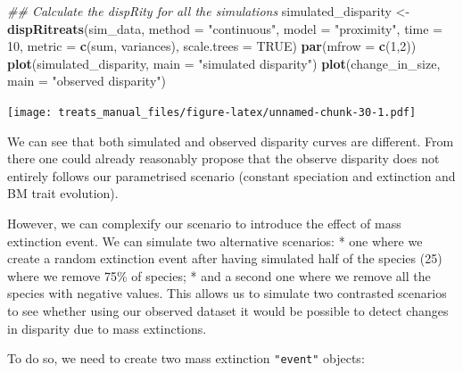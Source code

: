 \documentclass[
]{book}
\newenvironment{Shaded}{\begin{snugshade}}{\end{snugshade}}
\newcommand{\CommentTok}[1]{\textcolor[rgb]{0.56,0.35,0.01}{\textit{#1}}}
\newcommand{\DataTypeTok}[1]{\textcolor[rgb]{0.13,0.29,0.53}{#1}}
\newcommand{\DecValTok}[1]{\textcolor[rgb]{0.00,0.00,0.81}{#1}}
\newcommand{\KeywordTok}[1]{\textcolor[rgb]{0.13,0.29,0.53}{\textbf{#1}}}
\newcommand{\NormalTok}[1]{#1}
\newcommand{\OtherTok}[1]{\textcolor[rgb]{0.56,0.35,0.01}{#1}}
\newcommand{\StringTok}[1]{\textcolor[rgb]{0.31,0.60,0.02}{#1}}
\begin{document}
\begin{Shaded}
\begin{Highlighting}[]
\CommentTok{\#\# Calculate the dispRity for all the simulations}
\NormalTok{simulated\_disparity \textless{}{-}}\StringTok{ }\KeywordTok{dispRitreats}\NormalTok{(sim\_data,}
                                    \DataTypeTok{method =} \StringTok{"continuous"}\NormalTok{,}
                                    \DataTypeTok{model  =} \StringTok{"proximity"}\NormalTok{,}
                                    \DataTypeTok{time   =} \DecValTok{10}\NormalTok{,}
                                    \DataTypeTok{metric =} \KeywordTok{c}\NormalTok{(sum, variances),}
                                    \DataTypeTok{scale.trees =} \OtherTok{TRUE}\NormalTok{)}
\KeywordTok{par}\NormalTok{(}\DataTypeTok{mfrow =} \KeywordTok{c}\NormalTok{(}\DecValTok{1}\NormalTok{,}\DecValTok{2}\NormalTok{))}
\KeywordTok{plot}\NormalTok{(simulated\_disparity, }\DataTypeTok{main =} \StringTok{"simulated disparity"}\NormalTok{)}
\KeywordTok{plot}\NormalTok{(change\_in\_size, }\DataTypeTok{main =} \StringTok{"observed disparity"}\NormalTok{)}
\end{Highlighting}
\end{Shaded}

\texttt{[image: treats\_manual\_files/figure-latex/unnamed-chunk-30-1.pdf]}

We can see that both simulated and observed disparity curves are different.
From there one could already reasonably propose that the observe disparity does not entirely follows our parametrised scenario (constant speciation and extinction and BM trait evolution).

However, we can complexify our scenario to introduce the effect of mass extinction event.
We can simulate two alternative scenarios:
* one where we create a random extinction event after having simulated half of the species (25) where we remove 75\% of species;
* and a second one where we remove all the species with negative values.
This allows us to simulate two contrasted scenarios to see whether using our observed dataset it would be possible to detect changes in disparity due to mass extinctions.

To do so, we need to create two mass extinction \texttt{"event"} objects:
\end{document}
